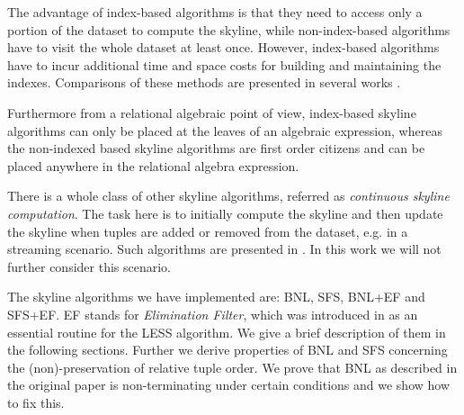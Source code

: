 The advantage of index-based algorithms is that they need to access
only a portion of the dataset to compute the skyline, while
non-index-based algorithms have to visit the whole dataset at least
once.  However, index-based algorithms have to incur additional time
and space costs for building and maintaining the indexes.  Comparisons
of these methods are presented in several works
\citep{Tan2001, Kossmann2002, Chomicki2003}.

Furthermore from a relational algebraic point of view, index-based
skyline algorithms can only be placed at the leaves of an algebraic
expression, whereas the non-indexed based skyline algorithms are first
order citizens and can be placed anywhere in the relational algebra 
expression.

There is a whole class of other skyline algorithms, referred as
\emph{continuous skyline computation}.  
The task here is to initially compute the skyline and then update the
skyline when tuples are added or removed from the dataset, e.g. in a
streaming scenario. 
Such algorithms are presented in \citep{Lin2005, Tao2006}. In this work
we will not further consider this scenario.




The skyline algorithms we have implemented are: BNL, SFS, BNL+EF and
SFS+EF. EF stands for {\em Elimination Filter}, which was introduced
in \citep{Godfrey2005} as an essential routine for the LESS algorithm.
We give a brief description of them in the following sections.
Further we derive properties of BNL and SFS concerning the
(non)-preservation of relative tuple order.  We prove that BNL as
described in the original paper is non-terminating under certain
conditions and we show how to fix this.


